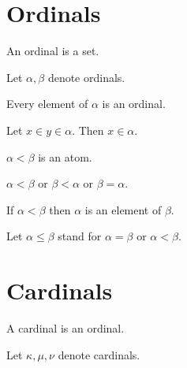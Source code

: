 \documentclass{article}
\begin{document}
\section{Ordinals}

  \begin{forthel}
    \begin{signature}
      An ordinal is a set.
    \end{signature}

    Let $\alpha, \beta$ denote ordinals.

    \begin{axiom}
      Every element of $\alpha$ is an ordinal.
    \end{axiom}

    \begin{axiom}[Transitivity]
      Let $x\in y\in \alpha$.
      Then $x\in \alpha$.
    \end{axiom}

    \begin{signature}
      $\alpha < \beta$ is an atom.
    \end{signature}

    \begin{axiom}
      $\alpha < \beta$ or $\beta < \alpha$ or $\beta = \alpha$.
    \end{axiom}

    \begin{axiom}
      If $\alpha < \beta$ then $\alpha$ is an element of $\beta$.
    \end{axiom}

    Let $\alpha \leq \beta$ stand for $\alpha = \beta$ or $\alpha < \beta$.
  \end{forthel}

  \section{Cardinals}

  \begin{forthel}
    \begin{signature}
      A cardinal is an ordinal.
    \end{signature}

    Let $\kappa, \mu, \nu$ denote cardinals.
  \end{forthel}
\end{document}
